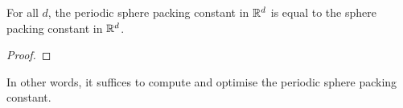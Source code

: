 \begin{theorem}\label{periodic-packing-optimal}\notready
    For all $d$, the periodic sphere packing constant in $\mathbb{R}^d$ is equal to the sphere packing constant in $\mathbb{R}^d$.
\end{theorem}
\begin{proof}
\end{proof}

In other words, it suffices to compute and optimise the periodic sphere packing constant.

